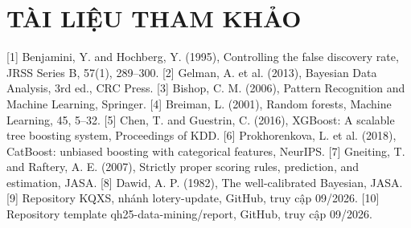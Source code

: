\chapter*{TÀI LIỆU THAM KHẢO}

[1] Benjamini, Y. and Hochberg, Y. (1995), Controlling the false discovery rate, JRSS Series B, 57(1), 289--300.
[2] Gelman, A. et al. (2013), Bayesian Data Analysis, 3rd ed., CRC Press.
[3] Bishop, C. M. (2006), Pattern Recognition and Machine Learning, Springer.
[4] Breiman, L. (2001), Random forests, Machine Learning, 45, 5--32.
[5] Chen, T. and Guestrin, C. (2016), XGBoost: A scalable tree boosting system, Proceedings of KDD.
[6] Prokhorenkova, L. et al. (2018), CatBoost: unbiased boosting with categorical features, NeurIPS.
[7] Gneiting, T. and Raftery, A. E. (2007), Strictly proper scoring rules, prediction, and estimation, JASA.
[8] Dawid, A. P. (1982), The well-calibrated Bayesian, JASA.
[9] Repository KQXS, nhánh lotery-update, GitHub, truy cập 09/2026.
[10] Repository template qh25-data-mining/report, GitHub, truy cập 09/2026.
